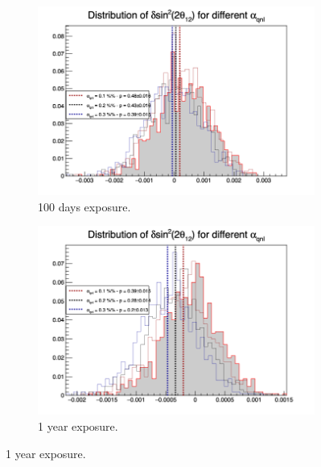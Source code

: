 \documentclass[../main.tex]{subfiles}
\begin{document}
\begin{figure}[th]
  \centering
  \begin{subfigure}[t]{0.48\linewidth}
    \includegraphics[width=\linewidth]{images/joint_fit/stat_tests/chi2_delta_100d.png}
    \caption{100 days exposure.}
  \end{subfigure}
  \begin{subfigure}[t]{0.48\linewidth}
    \includegraphics[width=\linewidth]{images/joint_fit/stat_tests/chi2_delta_1y.png}
    \caption{1 year exposure.}
  \end{subfigure}



\end{figure}
\end{document}
